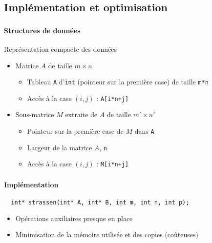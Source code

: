 \documentclass{beamer}
\begin{document}
\subsection{Implémentation et optimisation}
\begin{frame}[fragile]
  \frametitle{\insertsubsection}
  \framesubtitle{Structures de données}
  Représentation compacte des données
  \begin{itemize}
    \item<2-> Matrice $A$ de taille $m\times n$
    \begin{itemize}
      \item Tableau \verb=A= d'\verb=int=
      (pointeur sur la première case) de taille \verb=m*n=
      \item Accès à la case $(i,j)$ : \verb=A[i*n+j]=
    \end{itemize}
    \item<3-> Sous-matrice $M$ extraite de $A$ de taille $m'\times n'$
    \begin{itemize}
      \item Pointeur sur la première case de $M$ dans \verb=A=
      \item Largeur de la matrice $A$, \verb=n=
      \item Accès à la case $(i,j)$ : \verb=M[i*n+j]=
    \end{itemize}
  \end{itemize}
\end{frame}

\begin{frame}[fragile]
  \frametitle{\insertsubsection}
  \framesubtitle{Implémentation}
  \small\begin{verbatim}
  int* strassen(int* A, int* B, int m, int n, int p);
  \end{verbatim}\normalsize

  \begin{itemize}
    \item Opérations auxiliaires presque en place
    \item Minimisation de la mémoire utilisée et des copies (coûteuses)
  \end{itemize}
\end{frame}
\end{document}

